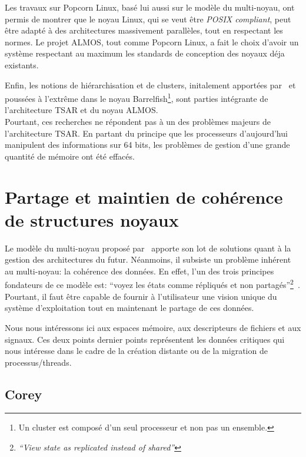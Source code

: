       Les travaux sur Popcorn Linux, basé lui aussi sur le modèle du
      multi-noyau, ont permis de montrer que le noyau Linux, qui se veut être
      \textit{POSIX compliant}, peut être adapté à des architectures massivement
      parallèles, tout en respectant les normes. Le projet ALMOS, tout comme
      Popcorn Linux, a fait le choix d'avoir un système respectant au maximum
      les standards de conception des noyaux déja existants.

      Enfin, les notions de hiérarchisation et de clusters, initalement
      apportées par~\citet{unrau1995hierarchical} et poussées à l'extrême dans
      le noyau Barrelfish\footnote{Un cluster est composé d'un seul processeur
        et non pas un ensemble.}, sont parties intégrante de l'architecture TSAR
      et du noyau ALMOS.\\

      Pourtant, ces recherches ne répondent pas à un des problèmes majeurs de
      l'architecture TSAR. En partant du principe que les processeurs
      d'aujourd'hui manipulent des informations sur 64 bits, les problèmes de
      gestion d'une grande quantité de mémoire ont été effacés.


  \section{Partage et maintien de cohérence de structures noyaux}
  \label{sec:consistency}

    Le modèle du multi-noyau proposé par~\citeauthor{baumann2009multikernel}
    apporte son lot de solutions quant à la gestion des architectures du
    futur. Néanmoins, il subsiste un problème inhérent au multi-noyau: la
    cohérence des données. En effet, l'un des trois principes fondateurs de ce
    modèle est: ``voyez les états comme répliqués et non
    partagés''\footnote{\textit{``View state as replicated instead of
        shared''}}~\citep{baumann2009multikernel}. Pourtant, il faut être
    capable de fournir à l'utilisateur une vision unique du système
    d'exploitation tout en maintenant le partage de ces données.

    Nous nous intéressons ici aux espaces mémoire, aux descripteurs de fichiers
    et aux signaux. Ces deux points dernier points représentent les données
    critiques qui nous intéresse dans le cadre de la création distante ou de la
    migration de processus/threads.

    \subsection{Corey}
    \label{subsec:corey}

